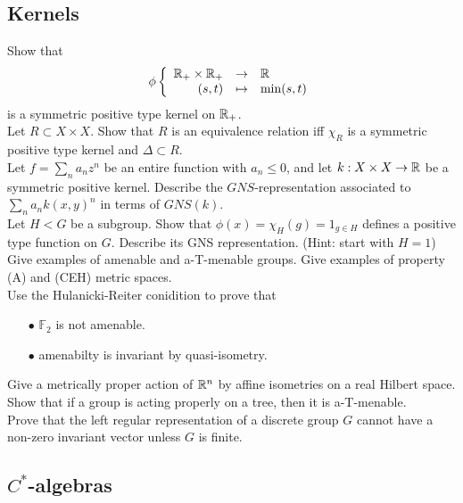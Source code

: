 \subsection{Kernels}

Show that \[\phi \left\{\begin{array}{rcl} \mathbb R_+ \times \mathbb R_+ & \rightarrow & \mathbb R \\ (s,t) & \mapsto & \min(s,t)\end{array}\right.\]
is a symmetric positive type kernel on $\mathbb R_+$.\\

Let $R\subset X\times X$. Show that $R$ is an equivalence relation iff $\chi_R$ is a symmetric positive type kernel and $\Delta\subset R$.\\
 
Let $f=\sum_n a_n z^n$ be an entire function with $a_n\leq 0$, and let $k: X\times X\rightarrow \mathbb R$ be a symmetric positive kernel. Describe the $GNS$-representation associated to $\sum_n a_n k(x,y)^n$ in terms of $GNS(k)$.\\

Let $H<G$ be a subgroup. Show that $\phi(x)=\chi_H(g)= 1_{g\in H}$ defines a positive type function on $G$. Describe its GNS representation. (Hint: start with $H=1$)\\

Give examples of amenable and a-T-menable groups. Give examples of property (A) and (CEH) metric spaces.\\ 

Use the Hulanicki-Reiter conidition to prove that
\begin{itemize}
\item[$\bullet$] $\mathbb F_2$ is not amenable.
\item[$\bullet$] amenabilty is invariant by quasi-isometry.	
\end{itemize}

Give a  metrically proper action of $\mathbb R^n$ by affine isometries on a real Hilbert space.\\

Show that if a group is acting properly on a tree, then it is a-T-menable.\\

Prove that the left regular representation of a discrete group $G$ cannot have a non-zero invariant vector unless $G$ is finite.\\

\subsection{$C^*$-algebras}


